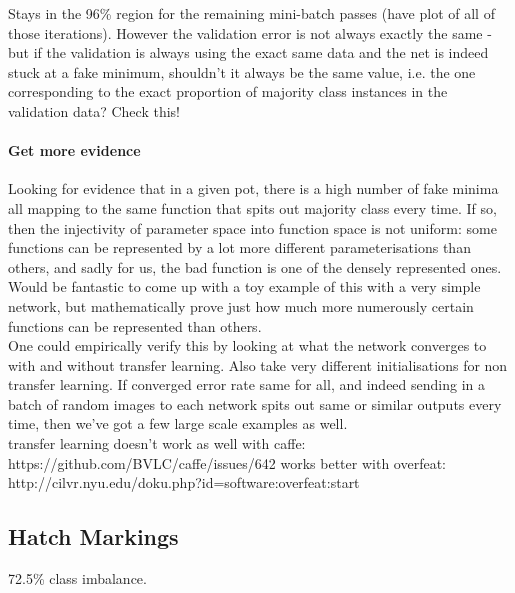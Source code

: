 \documentclass[a4paper,11pt]{article}
\begin{document}
Stays in the 96\% region for the remaining mini-batch passes (have plot of all of those iterations). However the validation error is not always exactly the same - but if the validation is always using the exact same data and the net is indeed stuck at a fake minimum, shouldn't it always be the same value, i.e. the one corresponding to the exact proportion of majority class instances in the validation data? Check this!\\


\paragraph{Get more evidence}

Looking for evidence that in a given pot, there is a high number of fake minima all mapping to the same function that spits out majority class every time. If so, then the injectivity of parameter space into function space is not uniform: some functions can be represented by a lot more different parameterisations than others, and sadly for us, the bad function is one of the densely represented ones. Would be fantastic to come up with a toy example of this with a very simple network, but mathematically prove just how much more numerously certain functions can be represented than others. \\

One could empirically verify this by looking at what the network converges to with and without transfer learning. Also take very different initialisations for non transfer learning. If converged error rate same for all, and indeed sending in a batch of random images to each network spits out same or similar outputs every time, then we've got a few large scale examples as well. \\

transfer learning doesn't work as well with caffe:
https://github.com/BVLC/caffe/issues/642
works better with overfeat: http://cilvr.nyu.edu/doku.php?id=software:overfeat:start


\subsection{Hatch Markings}

72.5\% class imbalance. 

\end{document}
